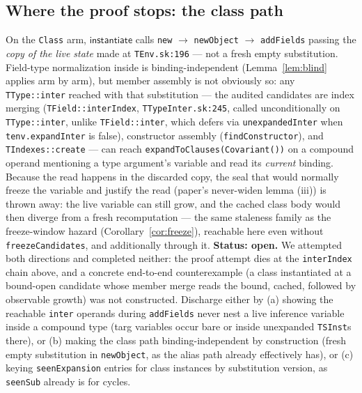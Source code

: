 \documentclass[11pt]{article}
\newcommand{\instop}{\mathsf{instantiate}}
\begin{document}
\subsection{Where the proof stops: the class path}

\begin{obligation}
\label{obl:classsym}
On the \texttt{Class} arm, $\instop$ calls
\texttt{new} $\to$ \texttt{newObject} $\to$ \texttt{addFields} passing
the \emph{copy of the live state} made at \texttt{TEnv.sk:196} — not a
fresh empty substitution. Field-type normalization inside is
binding-independent (Lemma~\ref{lem:blind} applies arm by arm), but member
assembly is not obviously so: any \texttt{TType::inter} reached with
that substitution — the audited candidates are index merging
(\texttt{TField::interIndex}, \texttt{TTypeInter.sk:245}, called
unconditionally on \texttt{TType::inter}, unlike \texttt{TField::inter},
which defers via \texttt{unexpandedInter} when
\texttt{tenv.expandInter} is false), constructor assembly
(\texttt{findConstructor}), and \texttt{TIndexes::create} — can reach
\texttt{expandToClauses(Covariant())} on a compound operand mentioning a
type argument's variable and read its \emph{current} binding. Because
the read happens in the discarded copy, the seal that would normally
freeze the variable and justify the read (paper's
never-widen lemma (iii)) is thrown away: the live variable can still
grow, and the cached class body would then diverge from a fresh
recomputation — the same staleness family as the freeze-window hazard
(Corollary~\ref{cor:freeze}), reachable here even without
\texttt{freezeCandidates}, and additionally through it. \textbf{Status:
open.} We attempted both directions and completed neither: the proof
attempt dies at the \texttt{interIndex} chain above, and a concrete
end-to-end counterexample (a class instantiated at a bound-open
candidate whose member merge reads the bound, cached, followed by
observable growth) was not constructed. Discharge either by (a) showing
the reachable \texttt{inter} operands during \texttt{addFields} never
nest a live inference variable inside a compound type (targ variables
occur bare or inside unexpanded \texttt{TSInst}s there), or (b) making
the class path binding-independent by construction (fresh empty substitution
in \texttt{newObject}, as the alias path already effectively has), or
(c) keying \texttt{seenExpansion} entries for class instances by
substitution version, as \texttt{seenSub} already is for cycles.
\end{obligation}
\end{document}
